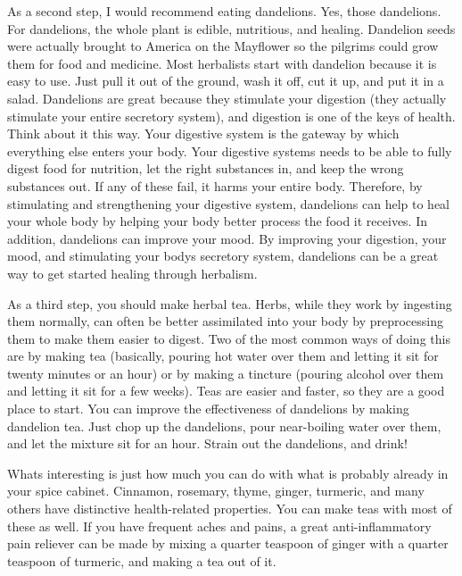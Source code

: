 \documentclass[letterpaper]{article}
\begin{document}
{\color{black}
As a second step, I would recommend eating dandelions. Yes, those
dandelions. For dandelions, the whole plant is edible, nutritious, and
healing.  Dandelion seeds were actually brought to America on the
Mayflower so the pilgrims could grow them for food and medicine.  Most
herbalists start with dandelion because it is easy to use. Just pull it
out of the ground, wash it off, cut it up, and put it in a salad.
Dandelions are great because they stimulate your digestion (they
actually stimulate your entire secretory system), and digestion is one
of the keys of health. Think about it this way. Your digestive system
is the gateway by which everything else enters your body. Your
digestive systems needs to be able to fully digest food for nutrition,
let the right substances in, and keep the wrong substances out. If any
of these fail, it harms your entire body. Therefore, by stimulating and
strengthening your digestive system, dandelions can help to heal your
whole body by helping your body better process the food it receives. In
addition, dandelions can improve your mood. By improving your
digestion, your mood, and stimulating your body{\textquotesingle}s
secretory system, dandelions can be a great way to get started healing
through herbalism.}

{\color{black}
As a third step, you should make herbal tea. Herbs, while they work by
ingesting them normally, can often be better assimilated into your body
by preprocessing them to make them easier to digest. Two of the most
common ways of doing this are by making tea (basically, pouring hot
water over them and letting it sit for twenty minutes or an hour) or by
making a tincture (pouring alcohol over them and letting it sit for a
few weeks). Teas are easier and faster, so they are a good place to
start. You can improve the effectiveness of dandelions by making
dandelion tea. Just chop up the dandelions, pour near-boiling water
over them, and let the mixture sit for an hour. Strain out the
dandelions, and drink!  }

{\color{black}
What{\textquotesingle}s interesting is just how much you can do with
what is probably already in your spice cabinet. Cinnamon, rosemary,
thyme, ginger, turmeric, and many others have distinctive
health-related properties. You can make teas with most of these as
well. If you have frequent aches and pains, a great anti-inflammatory
pain reliever can be made by mixing a quarter teaspoon of ginger with a
quarter teaspoon of turmeric, and making a tea out of it.}
\end{document}
